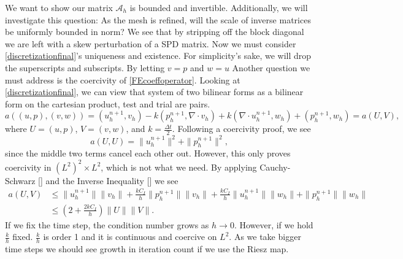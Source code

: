 \documentclass[11pt]{article}
\begin{document}
We want to show our matrix $\mathscr{A}_h$ is bounded and invertible. Additionally, we will investigate this question: As the mesh is refined, will the scale of inverse matrices be uniformly bounded in norm? We see that by stripping off the block diagonal we are left with a skew perturbation of a SPD matrix. Now we must consider \eqref{discretizationfinal}'s uniqueness and existence. For simplicity's sake, we will drop the superscripts and subscripts. By letting $v = p$ and $w=u$  Another question we must address is the coercivity of \eqref{FEcoeffoperator}. %
Looking at \eqref{discretizationfinal}, we can view that system of two bilinear forms as a bilinear form on the cartesian product, test and trial are pairs. 
\begin{equation}\label{bilinear}
a((u,p),(v,w)) = (u_h^{n+1},v_h) - k(p_h^{n+1}, \nabla \cdot v_h) + k(\nabla \cdot u_h^{n+1},w_h) + (p_h^{n+1},w_h) = a(U,V),
\end{equation}
where $U = (u,p)$, $V = (v,w)$, and $k = \frac{\Delta t}{2}$. Following a coercivity proof, we see
\begin{equation}
a(U,U) = \|u_h^{n+1}\|^2 + \|p_h^{n+1}\|^2,
\end{equation}
since the middle two terms cancel each other out. However, this only proves coercivity in $(L^2)^2 \times L^2$, which is not what we need.
By applying Cauchy-Schwarz [] and the Inverse Inequality [] we see
\begin{equation}
\begin{split}
a(U,V) &\leq \|u_h^{n+1}\|\|v_h\| + \frac{kC_I}{h}\|p_h^{n+1}\|\|v_h\| + \frac{kC_I}{h}\|u_h^{n+1}\|\|w_h\| + \|p_h^{n+1}\|\|w_h\| \\
&\leq \left(2 + \frac{2kC_I}{h}\right)\|U\|\|V\|.
\end{split}
\end{equation}
If we fix the time step, the condition number grows as $h \rightarrow 0$. However, if we hold $\frac{k}{h}$ fixed. $\frac{k}{h}$ is order 1 and it is continuous and coercive on $L^2$. As we take bigger time steps we should see growth in iteration count if we use the Riesz map.
\end{document}
